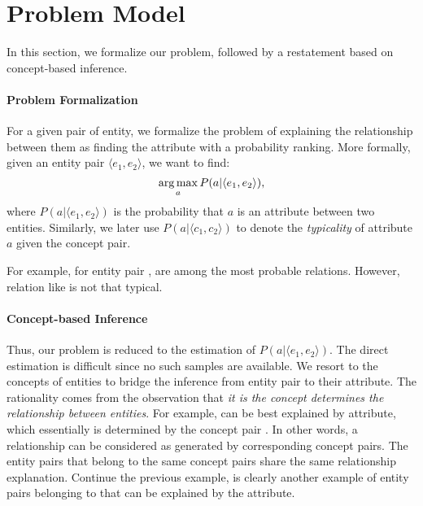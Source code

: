 
\section{Problem Model}
\label{sec:framework}
In this section, we formalize our problem, followed by a restatement based on concept-based inference.
\vspace{-2mm}
\paragraph{Problem Formalization}
For a given pair of entity, we formalize the problem of explaining the relationship between them as finding the attribute with a probability ranking.
More formally, given an entity pair $ \langle e_1, e_2 \rangle $, we want to find:
\begin{equation}
\operatorname*{arg\,max}_a P(a|\langle e_1,e_2 \rangle),
\end{equation}
where $P(a| \langle e_1, e_2 \rangle )$ is the probability that $a$ is an attribute between two entities. Similarly, we later use $P(a| \langle c_{1},c_{2} \rangle )$ to denote the {\it typicality} of attribute $a$ given the concept pair.

For example, for entity pair ,  are among the most probable relations.
However, relation like  is not that typical. 

\vspace{-2mm}
\paragraph{Concept-based Inference}
Thus, our problem is reduced to the estimation of $P(a| \langle e_1, e_2 \rangle )$.
The direct estimation is difficult since no such samples are available.
We resort to the concepts of entities to bridge the inference from entity pair to their attribute.
The rationality comes from the observation that {\it it is the concept determines the relationship between entities}. For example,  can be best explained by  attribute, which essentially is determined by the concept pair .
In other words, a relationship can be considered as generated by corresponding concept pairs.
The entity pairs that belong to the same concept pairs share the same relationship explanation.
Continue the previous example,  is clearly another example of entity pairs belonging to  that can be explained by the  attribute.

